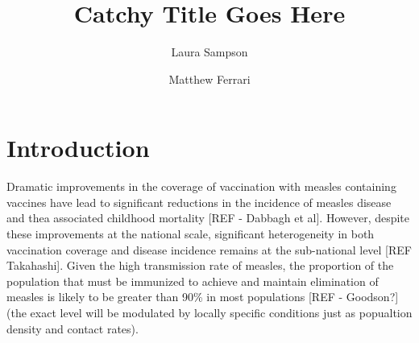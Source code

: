 \documentclass[nofootinbib,aps,pre,twocolumn,superscriptaddress,showkeys,showpacs]{revtex4-1}
\begin{document}
\title{Catchy Title Goes Here}
\author{Laura Sampson}
\author{Matthew Ferrari}

\begin{abstract}


\end{abstract}
\maketitle

\section{Introduction \label{sec:Intro}}
Dramatic improvements in the coverage of vaccination with measles containing vaccines have lead to significant reductions in the incidence of measles disease and thea associated childhood mortality [REF - Dabbagh et al]. 
However, despite these improvements at the national scale, significant heterogeneity in both vaccination coverage and disease incidence remains at the sub-national level [REF Takahashi].
Given the high transmission rate of measles, the proportion of the population that must be immunized to achieve and maintain elimination of measles is likely to be greater than 90\% in most populations [REF - Goodson?] (the exact level will be modulated by locally specific conditions just as popualtion density and contact rates).
\end{document}
